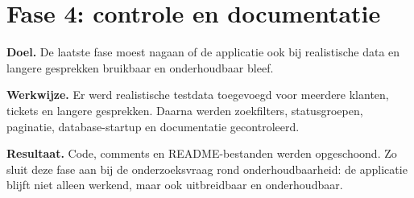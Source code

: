 \section{Fase 4: controle en documentatie}

\textbf{Doel.} De laatste fase moest nagaan of de applicatie ook bij realistische data en langere gesprekken bruikbaar en onderhoudbaar bleef.\par\noindent\textbf{Werkwijze.} Er werd realistische testdata toegevoegd voor meerdere klanten, tickets en langere gesprekken. Daarna werden zoekfilters, statusgroepen, paginatie, database-startup en documentatie gecontroleerd.\par\noindent\textbf{Resultaat.} Code, comments en README-bestanden werden opgeschoond. Zo sluit deze fase aan bij de onderzoeksvraag rond onderhoudbaarheid: de applicatie blijft niet alleen werkend, maar ook uitbreidbaar en onderhoudbaar.